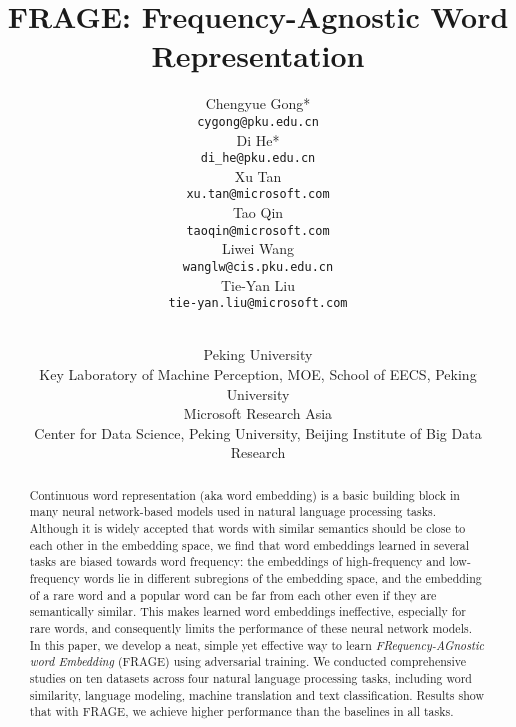 \documentclass{article}
\begin{document}
\title{FRAGE: Frequency-Agnostic Word Representation}
\author{
  Chengyue Gong*\\
  \texttt{cygong@pku.edu.cn}\\
  \And
  Di He*\\
  \texttt{di\_he@pku.edu.cn} \\
  \And
  Xu Tan\\
  \texttt{xu.tan@microsoft.com} \\
  \And
  Tao Qin\\
  \texttt{taoqin@microsoft.com} \\
  \And
  Liwei Wang\\
  \texttt{wanglw@cis.pku.edu.cn} \\
  \And
  Tie-Yan Liu\\
  \texttt{tie-yan.liu@microsoft.com} \\
  \and
  \\
  Peking University\\
Key Laboratory of Machine Perception, MOE, School of EECS, Peking University\\
  Microsoft Research Asia\\
  Center for Data Science, Peking University, Beijing Institute of Big Data Research
}
\maketitle
\begin{abstract}
Continuous word representation (aka word embedding) is a basic building block in many neural network-based models used in natural language processing tasks. Although it is widely accepted that words with similar semantics should be close to each other in the embedding space, we find that word embeddings learned in several tasks are biased towards word frequency: the embeddings of high-frequency and low-frequency words lie in different subregions of the embedding space, and the embedding of a rare word and a popular word can be far from each other even if they are semantically similar. This makes learned word embeddings ineffective, especially for rare words, and consequently limits the performance of these neural network models. In this paper, we develop a neat, simple yet effective way to learn \emph{FRequency-AGnostic word Embedding} (FRAGE) using adversarial training. We conducted comprehensive studies on ten datasets across four natural language processing tasks, including word similarity, language modeling, machine translation and text classification. Results show that with FRAGE, we achieve higher performance than the baselines in all tasks.
\end{abstract}
\end{document}
